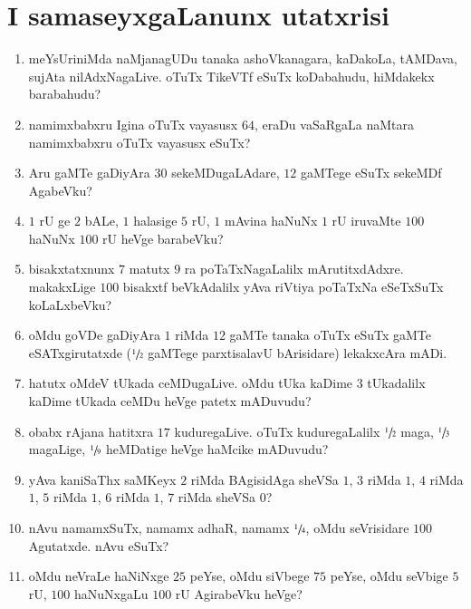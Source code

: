 \chapter{I samaseyxgaLanunx utatxrisi}

\begin{enumerate}
\renewcommand{\labelenumi}{\rm(\theenumi)}
\item meYsUriniMda naMjanagUDu tanaka ashoVkanagara, kaDakoLa, tAMDava, sujAta nilAdxNagaLive. oTuTx TikeVTf eSuTx koDabahudu, hiMdakekx barabahudu?

\item namimxbabxru Igina oTuTx vayasusx $64$, eraDu vaSaRgaLa naMtara namimxbabxru oTuTx vayasusx eSuTx?

\item Aru gaMTe gaDiyAra $30$ sekeMDugaLAdare, $12$ gaMTege eSuTx sekeMDf AgabeVku?

\item $1$ rU ge $2$ bALe, $1$ halasige $5$ rU, $1$ mAvina haNuNx $1$ rU iruvaMte $100$ haNuNx $100$ rU heVge barabeVku?

\item bisakxtatxnunx $7$ matutx $9$ ra poTaTxNagaLalilx mArutitxdAdxre. makakxLige $100$ bisakxtf beVkAdalilx yAva riVtiya poTaTxNa eSeTxSuTx koLaLxbeVku?

\item oMdu goVDe gaDiyAra $1$ riMda $12$ gaMTe tanaka oTuTx eSuTx gaMTe eSATxgirutatxde ($\sfrac{1}{2}$ gaMTege parxtisalavU bArisidare) lekakxcAra mADi.

\item hatutx oMdeV tUkada ceMDugaLive. oMdu tUka kaDime $3$ tUkadalilx kaDime tUkada ceMDu heVge patetx mADuvudu?

\item obabx rAjana hatitxra $17$ kuduregaLive. oTuTx kuduregaLalilx $\sfrac{1}{2}$ maga, $\sfrac{1}{3}$ magaLige, $\sfrac{1}{9}$ heMDatige heVge haMcike mADuvudu?

\item yAva kaniSaThx saMKeyx $2$ riMda BAgisidAga sheVSa $1$, $3$ riMda $1$, $4$ riMda $1$, $5$ riMda $1$, $6$ riMda $1$, $7$ riMda sheVSa $0$?

\item nAvu namamxSuTx, namamx adhaR, namamx $\sfrac{1}{4}$, oMdu seVrisidare $100$ Agutatxde. nAvu eSuTx?

\item oMdu neVraLe haNiNxge $25$ peYse, oMdu siVbege $75$ peYse, oMdu seVbige $5$ rU, $100$ haNuNxgaLu $100$ rU AgirabeVku heVge?


\end{enumerate}
